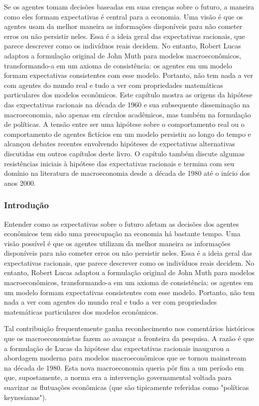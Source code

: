 \documentclass[a4paper,12pt]{article}[abntex2]
\begin{document}
Se os agentes tomam decisões baseadas em suas crenças sobre o futuro, a maneira como eles formam expectativas é central para a economia. Uma visão é que os agentes usam da melhor maneira as informações disponíveis para não cometer erros ou não persistir neles. Essa é a ideia geral das expectativas racionais, que parece descrever como os indivíduos reais decidem. No entanto, Robert Lucas adaptou a formulação original de John Muth para modelos macroeconômicos, transformando-a em um axioma de consistência: os agentes em um modelo formam expectativas consistentes com esse modelo. Portanto, não tem nada a ver com agentes do mundo real e tudo a ver com propriedades matemáticas particulares dos modelos econômicos. Este capítulo mostra as origens da hipótese das expectativas racionais na década de 1960 e sua subsequente disseminação na macroeconomia, não apenas em círculos acadêmicos, mas também na formulação de políticas. A tensão entre ser uma hipótese sobre o comportamento real ou o comportamento de agentes fictícios em um modelo persistiu ao longo do tempo e alcançou debates recentes envolvendo hipóteses de expectativas alternativas discutidas em outros capítulos deste livro. O capítulo também discute algumas resistências iniciais à hipótese das expectativas racionais e termina com seu domínio na literatura de macroeconomia desde a década de 1980 até o início dos anos 2000.

\subsubsection{\textbf{Introdução}}
Entender como as expectativas sobre o futuro afetam as decisões dos agentes econômicos tem sido uma preocupação na economia há bastante tempo. Uma visão possível é que os agentes utilizam da melhor maneira as informações disponíveis para não cometer erros ou não persistir neles. Essa é a ideia geral das expectativas racionais, que parece descrever como os indivíduos reais decidem. No entanto, Robert Lucas adaptou a formulação original de John Muth para modelos macroeconômicos, transformando-a em um axioma de consistência: os agentes em um modelo formam expectativas consistentes com esse modelo. Portanto, não tem nada a ver com agentes do mundo real e tudo a ver com propriedades matemáticas particulares dos modelos econômicos.

Tal contribuição frequentemente ganha reconhecimento nos comentários históricos que os macroeconomistas fazem ao avançar a fronteira da pesquisa. A razão é que a formulação de Lucas da hipótese das expectativas racionais inaugurou a abordagem moderna para modelos macroeconômicos que se tornou mainstream na década de 1980. Esta nova macroeconomia queria pôr fim a um período em que, supostamente, a norma era a intervenção governamental voltada para suavizar as flutuações econômicas (que são tipicamente referidas como "políticas keynesianas").
\end{document}
